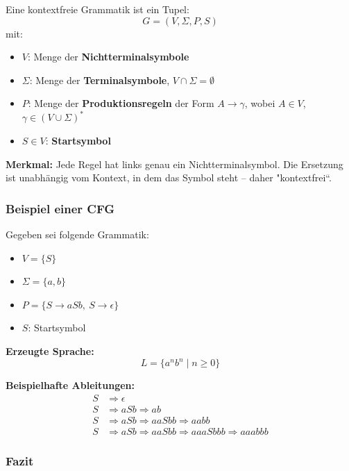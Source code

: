 \documentclass[a4paper,12pt]{article}
\begin{document}
\begin{enumerate}
			Eine kontextfreie Grammatik ist ein Tupel:
			\[
			G = (V, \Sigma, P, S)
			\]
			mit:
			
			\begin{itemize}
				\item \( V \): Menge der \textbf{Nichtterminalsymbole}
				\item \( \Sigma \): Menge der \textbf{Terminalsymbole}, \( V \cap \Sigma = \emptyset \)
				\item \( P \): Menge der \textbf{Produktionsregeln} der Form \( A \rightarrow \gamma \), wobei \( A \in V \), \( \gamma \in (V \cup \Sigma)^* \)
				\item \( S \in V \): \textbf{Startsymbol}
			\end{itemize}
			
			\textbf{Merkmal:}  
			Jede Regel hat links genau ein Nichtterminalsymbol. Die Ersetzung ist unabhängig vom Kontext, in dem das Symbol steht – daher "kontextfrei“.
			
			\subsubsection*{Beispiel einer CFG}
			
			Gegeben sei folgende Grammatik:
			
			\begin{itemize}
				\item \( V = \{S\} \)
				\item \( \Sigma = \{a, b\} \)
				\item \( P = \{S \rightarrow aSb,\ S \rightarrow \epsilon\} \)
				\item \( S \): Startsymbol
			\end{itemize}
			
			\textbf{Erzeugte Sprache:}
			\[
			L = \{ a^n b^n \mid n \geq 0 \}
			\]
			
			\textbf{Beispielhafte Ableitungen:}
			\begin{align*}
				S &\Rightarrow \epsilon \\
				S &\Rightarrow aSb \Rightarrow ab \\
				S &\Rightarrow aSb \Rightarrow aaSbb \Rightarrow aabb \\
				S &\Rightarrow aSb \Rightarrow aaSbb \Rightarrow aaaSbbb \Rightarrow aaabbb
			\end{align*}
			
			\subsubsection*{Fazit}
			

\end{enumerate}
\end{document}
